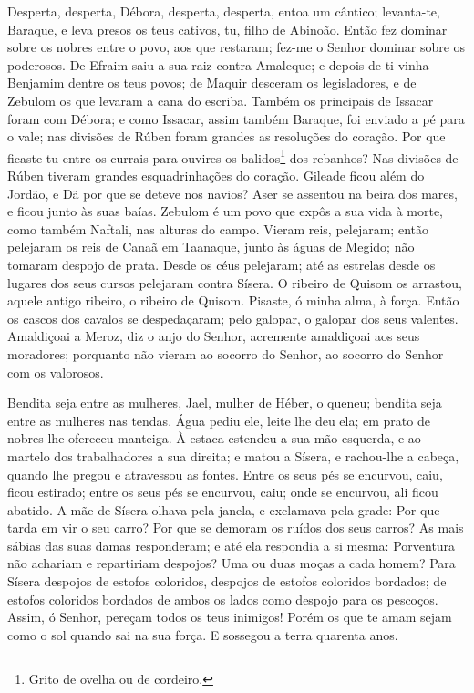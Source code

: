 Desperta, desperta, Débora, desperta, desperta, entoa um cântico;
levanta-te, Baraque, e leva presos os teus cativos, tu, filho de
Abinoão. Então fez dominar sobre os nobres entre o povo, aos
que restaram; fez-me o Senhor dominar sobre os poderosos. De
Efraim saiu a sua raiz contra Amaleque; e depois de ti vinha
Benjamim dentre os teus povos; de Maquir desceram os legisladores, e
de Zebulom os que levaram a cana do escriba. Também os
principais de Issacar foram com Débora; e como Issacar, assim também
Baraque, foi enviado a pé para o vale; nas divisões de Rúben foram
grandes as resoluções do coração. Por que ficaste tu entre os
currais para ouvires os balidos\footnote{Grito de ovelha ou de
cordeiro.} dos rebanhos? Nas divisões de Rúben tiveram grandes
esquadrinhações do coração. Gileade ficou além do Jordão, e
Dã por que se deteve nos navios? Aser se assentou na beira dos
mares, e ficou junto às suas baías. Zebulom é um povo que
expôs a sua vida à morte, como também Naftali, nas alturas do campo.
Vieram reis, pelejaram; então pelejaram os reis de Canaã em
Taanaque, junto às águas de Megido; não tomaram despojo de prata.
Desde os céus pelejaram; até as estrelas desde os lugares dos
seus cursos pelejaram contra Sísera. O ribeiro de Quisom os
arrastou, aquele antigo ribeiro, o ribeiro de Quisom. Pisaste, ó
minha alma, à força. Então os cascos dos cavalos se
despedaçaram; pelo galopar, o galopar dos seus valentes.
Amaldiçoai a Meroz, diz o anjo do Senhor, acremente
amaldiçoai aos seus moradores; porquanto não vieram ao socorro do
Senhor, ao socorro do Senhor com os valorosos.

Bendita seja entre as mulheres, Jael, mulher de Héber, o queneu;
bendita seja entre as mulheres nas tendas. Água pediu ele,
leite lhe deu ela; em prato de nobres lhe ofereceu manteiga.
À estaca estendeu a sua mão esquerda, e ao martelo dos
trabalhadores a sua direita; e matou a Sísera, e rachou-lhe a
cabeça, quando lhe pregou e atravessou as fontes. Entre os
seus pés se encurvou, caiu, ficou estirado; entre os seus pés se
encurvou, caiu; onde se encurvou, ali ficou abatido. A mãe de
Sísera olhava pela janela, e exclamava pela grade: Por que tarda em
vir o seu carro? Por que se demoram os ruídos dos seus carros?
As mais sábias das suas damas responderam; e até ela
respondia a si mesma: Porventura não achariam e repartiriam
despojos? Uma ou duas moças a cada homem? Para Sísera despojos de
estofos coloridos, despojos de estofos coloridos bordados; de
estofos coloridos bordados de ambos os lados como despojo para os
pescoços. Assim, ó Senhor, pereçam todos os teus inimigos!
Porém os que te amam sejam como o sol quando sai na sua força.
E sossegou a terra quarenta anos.

